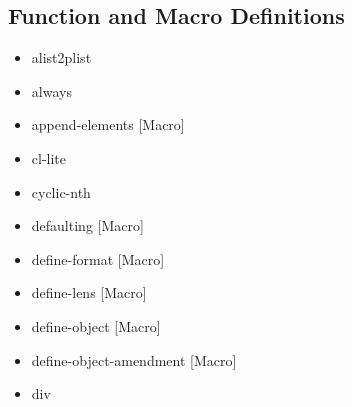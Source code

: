 \documentclass [11pt]{book}
\begin{document}
\subsection{Function and Macro Definitions}

\label{subsec:functionandmacrodefinitions}



\begin{itemize}

\item {}alist2plist





\item {}always





\item {}append-elements [Macro]





\item {}cl-lite





\item {}cyclic-nth





\item {}defaulting [Macro]





\item {}define-format [Macro]





\item {}define-lens [Macro]





\item {}define-object [Macro]





\item {}define-object-amendment [Macro]





\item {}div






\end{itemize}
\end{document}
